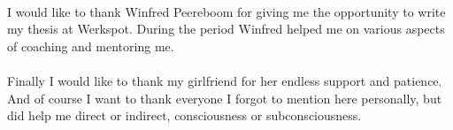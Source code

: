 \documentclass[../main.tex]{subfiles}
\begin{document}
    \paragraph{}
    I would like to thank Winfred Peereboom for giving me the opportunity to write my thesis at Werkspot.
    During the period Winfred helped me on various aspects of coaching and mentoring me.
	
    \paragraph{}
    Finally I would like to thank my girlfriend for her endless support and patience.
    And of course I want to thank everyone I forgot to mention here personally, but did help me direct or indirect, consciousness or subconsciousness.
\end{document}
